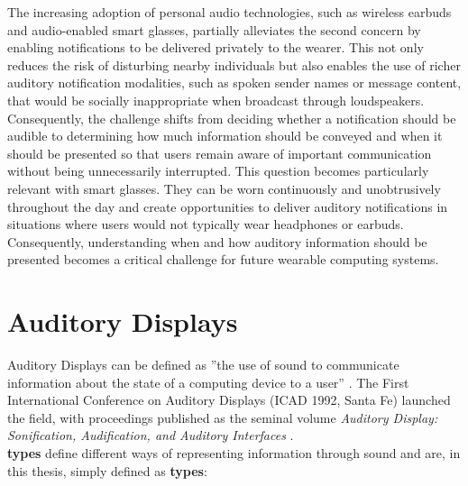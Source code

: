 The increasing adoption of personal audio technologies, such as wireless earbuds and audio-enabled smart glasses, partially alleviates the second concern by enabling notifications to be delivered privately to the wearer. This not only reduces the risk of disturbing nearby individuals but also enables the use of richer auditory notification modalities, such as spoken sender names or message content, that would be socially inappropriate when broadcast through loudspeakers. Consequently, the challenge shifts from deciding whether a notification should be audible to determining how much information should be conveyed and when it should be presented so that users remain aware of important communication without being unnecessarily interrupted. This question becomes particularly relevant with smart glasses. They can be worn continuously and unobtrusively throughout the day and create opportunities to deliver auditory notifications in situations where users would not typically wear headphones or earbuds. Consequently, understanding when and how auditory information should be presented becomes a critical challenge for future wearable computing systems.

\section{Auditory Displays}
Auditory Displays can be defined as ''the use of sound to communicate information about the state of a computing device to a user'' \cite{Mcgookin_04_ExplainAuditoryDisplaysWiki}. The First International Conference on Auditory Displays (ICAD 1992, Santa Fe) launched the field, with proceedings published as the seminal volume \textit{Auditory Display: Sonification, Audification, and Auditory Interfaces} \cite{Kramer_94_AuditoryDisplay}.\\
\textbf{\glspl{type}} define different ways of representing information through sound and are, in this thesis, simply defined as \textbf{\glspl{type}}:

